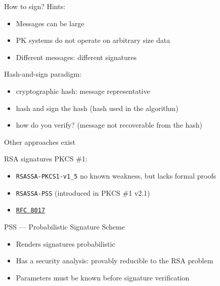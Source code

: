 \begin{frame}{How to sign?}
  Hints:
  \begin{itemize} 
    \item Messages can be large
    \item PK systems do not operate on arbitrary size data
    \item Different messages: different signatures
  \end{itemize}

  \pause
  Hash-and-sign paradigm:
  \begin{itemize}[<+(1)->]
    \item cryptographic hash: message representative
    \item hash and sign the hash (hash used in the algorithm)
    \item how do you verify? (message not recoverable from the hash)
  \end{itemize}

  \pause
  Other approaches exist
\end{frame}

\begin{frame}{RSA signatures}
  \pause
  PKCS \#1:
  \begin{itemize}[<+(1)->]
    \item \texttt{RSASSA-PKCS1-v1\_5} no known weakness, but lacks formal proofs
    \item \texttt{RSASSA-PSS} (introduced in PKCS \#1 v2.1)
    \item \href{https://datatracker.ietf.org/doc/html/rfc8017}{\texttt{RFC 8017}}
  \end{itemize}

  \vfill

  \pause
  PSS --- Probabilistic Signature Scheme
  \begin{itemize}[<+(1)->]
    \item Renders signatures probabilistic
    \item Has a security analysis: provably reducible to the RSA problem
    \item Parameters must be known before signature verification 
  \end{itemize}
\end{frame}

